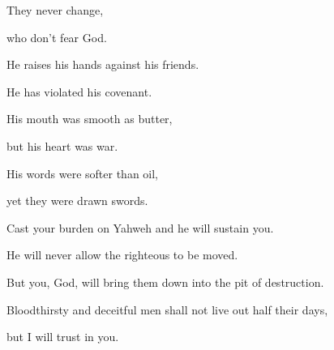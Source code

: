 {\BB \par }{\Q They never change,
\par }{\QB who don’t fear God.
\par }{\Q {}He raises his hands against his friends.
\par }{\QB He has violated his covenant.
\par }{\Q {}His mouth was smooth as butter,
\par }{\QB but his heart was war.
\par }{\Q His words were softer than oil,
\par }{\QB yet they were drawn swords.
\par }{\BB \par }{\Q {}Cast your burden on Yahweh and he will sustain you.
\par }{\QB He will never allow the righteous to be moved.
\par }{\Q {}But you, God, will bring them down into the pit of destruction.
\par }{\QB Bloodthirsty and deceitful men shall not live out half their days,
\par }{\QB but I will trust in you.

}
